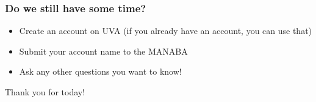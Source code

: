 \documentclass{beamer}
\begin{document}

\begin{frame}
  \frametitle{Do we still have some time?}

  \begin{itemize}
  \item Create an account on UVA (if you already have an account, you can use that)

    \bigskip

  \item Submit your account name to the MANABA

    \bigskip

  \item Ask any other questions you want to know!
  \end{itemize}

  \bigskip

  \begin{center}
    Thank you for today!
  \end{center}
\end{frame}
\end{document}
